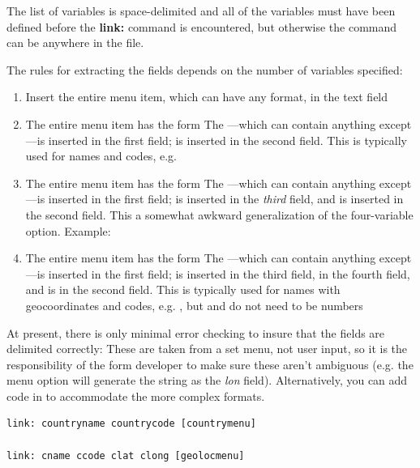 \documentclass[letterpaper,10pt,english]{sphinxmanual}
\begin{document}
The list of variables is space-delimited and all of the variables must have been defined before the \textbf{link:}
command is encountered, but otherwise the command can be anywhere in the file.

The rules for extracting the fields depends on the number of variables specified:
\begin{enumerate}
\item {} 
Insert the entire menu item, which can have any format, in the text field

\item {} 
The entire menu item has the form   The —which can contain anything except
\code{{[} {]}}—is inserted in the first field;  is inserted in the second field. This is typically used for names
and codes, e.g. 

\item {} 
The entire menu item has the form   The —which can contain anything except
\code{(  )}—is inserted in the first field;  is inserted in the \emph{third} field, and  is inserted
in the second field. This a somewhat awkward generalization of the four-variable option.
Example: 

\item {} 
The entire menu item has the form   The —which can contain anything except
\code{(  )}—is inserted in the first field;  is inserted  in the third field,  in the fourth field,
and  is in the second field. This is typically used for names with geocoordinates and codes,
e.g. , but  and  do not need to be numbers

\end{enumerate}

At present, there is only minimal error checking to insure that the fields are delimited correctly: These are taken
from a set menu, not user input, so it is the responsibility of the form developer to make sure these aren't ambiguous
(e.g. the menu option  will generate the string 
as the \emph{lon} field). Alternatively, you can add code in  to accommodate the more complex formats.

\begin{Verbatim}[commandchars=\\\{\}]
link: countryname countrycode [countrymenu]

link: cname ccode clat clong [geolocmenu]
\end{Verbatim}
\end{document}

